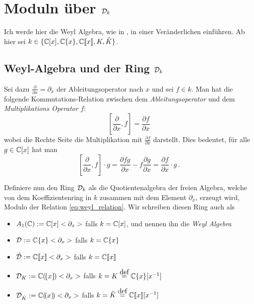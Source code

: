 
\chapter{Moduln über $\mathcal{D}_k$}
Ich werde hier die Weyl Algebra, wie in \cite[Chapter~1]{sabbah_cimpa90}, in
einer Veränderlichen einführen. 
Ab hier sei $k\in \{ \mathbb{C}[x],{\mathbb C \{x\}},{\mathbb C\llbracket x\rrbracket},K,\hat K \}$.

\section{Weyl-Algebra und der Ring $\mathcal{D}_k$} 
Sei dazu $\frac{\partial}{\partial x}=\partial_x$ der Ableitungsoperator nach
$x$ und sei $f \in k$.
Man hat die folgende
Kommutations-Relation zwischen dem \emph{Ableitungsoperator} und dem
\emph{Multiplikations Operator} $f$:
\begin{equation}\label{eq:weyl_relation}
[\frac{\partial}{\partial x},f]=\frac{\partial f}{\partial x}
\end{equation}
wobei die Rechte Seite die Multiplikation mit $\frac{\partial f}{\partial x}$
darstellt. Dies bedeutet, für alle $g\in\mathbb{C}[x]$ hat man
\[
[\frac{\partial}{\partial x},f]\cdot g
=\frac{\partial fg}{\partial x} - f\frac{\partial g}{\partial x}
=\frac{\partial f}{\partial x} \cdot g \,.
\]
\begin{defn}
Definiere nun den Ring $\mathcal{D}_k$ als die Quotientenalgebra der freien Algebra,
welche von dem Koeffizientenring in $k$ zusammen mit dem Element $\partial_x$,
erzeugt wird, Modulo der Relation \eqref{eq:weyl_relation}.  Wir schreiben
diesen Ring auch als
\begin{itemize}
\item $A_1(\mathbb{C}):=\mathbb{C}[x]<\partial_x>$ falls $k=\mathbb{C}[x]$, und nennen ihn die
\emph{Weyl Algebra}
\item $\mathcal{D}:=\mathbb{C}\{x\}<\partial_x>$ falls $k=\mathbb{C}\{x\}$
\item $\hat{\mathcal{D}}:={\mathbb C\llbracket x\rrbracket}<\partial_x>$ falls $k={\mathbb C\llbracket x\rrbracket}$
\item $\mathcal{D}_K:={\mathbb C (\!\{x\}\!)}<\partial_x>$ falls
$k=K\overset{\mbox{def}}{=}\mathbb{C}\{x\}[x^{-1}]$
\item $\mathcal{D}_{\hat K}:={\mathbb C (\!(x)\!)}<\partial_x>$ falls $k=\hat
K\overset{\mbox{def}}{=}{\mathbb C\llbracket x\rrbracket}[x^{-1}]$
\end{itemize}
\end{defn}

